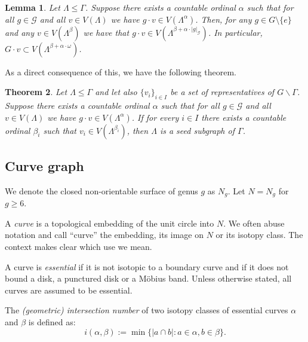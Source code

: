 \documentclass{artv3}
\newtheorem{theorem}{Theorem}[section]
\newtheorem{lemma}[theorem]{Lemma}
\begin{document}
\begin{lemma}\label{lemma:groupYinY}
 Let $\Lambda \leq \Gamma$. Suppose there exists a countable ordinal $\alpha$ such that for all $g \in \mathcal{G}$ and all $v \in V(\Lambda)$ we have $g \cdot v \in V(\Lambda^{\alpha})$. Then, for any $g \in G \setminus \{e\}$ and any $v \in V(\Lambda^{\beta})$ we have that $g \cdot v \in V(\Lambda^{\beta + \alpha \cdot |g|_{\mathcal{G}}})$. In particular, $G \cdot v \subset V(\Lambda^{\beta + \alpha \cdot \omega})$.
\end{lemma}

As a direct consequence of this, we have the following theorem.

\begin{theorem}\label{thm:seedgraph}
 Let $\Lambda \leq \Gamma$ and let also $\{v_{i}\}_{i \in I}$ be a set of representatives of $G \backslash \Gamma$. Suppose there exists a countable ordinal $\alpha$ such that for all $g \in \mathcal{G}$ and all $v \in V(\Lambda)$ we have $g \cdot v \in V(\Lambda^{\alpha})$. If for every $i \in I$ there exists a countable ordinal $\beta_{i}$ such that $v_{i} \in V(\Lambda^{\beta_{i}})$, then $\Lambda$ is a seed subgraph of $\Gamma$.
\end{theorem}

\subsection{Curve graph}\label{subsec:curvegraph}

We denote the closed non-orientable surface of genus $g$ as $N_{g}$. Let $N = N_g$ for $g \geq 6$.

A \textit{curve} is a topological embedding of the unit circle into $N$. We often abuse notation and call ``curve'' the embedding, its image on $N$ or its isotopy class. The context makes clear which use we mean.

A curve is \textit{essential} if it is not isotopic to a boundary curve and if it does not bound a disk, a punctured disk or a Möbius band. Unless otherwise stated, all curves are assumed to be essential.

The \textit{(geometric) intersection number} of two isotopy classes of essential curves $\alpha$ and $\beta$ is defined as: $$i(\alpha,\beta):= \min \{|a \cap b| : a \in \alpha, b \in \beta\}.$$
\end{document}
